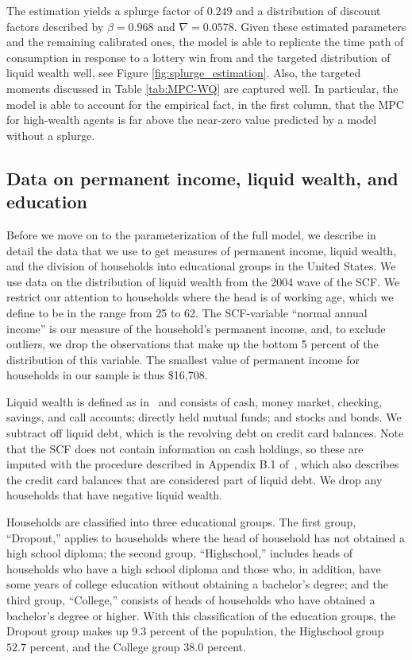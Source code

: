 \documentclass[\PathToRoot/\ProjectName]{subfiles}
\begin{document}
The estimation yields a splurge factor of $0.249$ and a distribution of discount factors described by $\beta = 0.968$ and $\nabla=0.0578$.
Given these estimated parameters and the remaining calibrated ones, the model is able to replicate the time path of consumption in response to a lottery win from \cite{fagereng-mpc-2021} and the targeted distribution of liquid wealth well, see Figure \ref{fig:splurge_estimation}.
Also, the targeted moments discussed in Table \ref{tab:MPC-WQ} are captured well.
In particular, the model is able to account for the empirical fact, in the first column, that the MPC for high-wealth agents is far above the near-zero value predicted by a model without a splurge.

\subsection{Data on permanent income, liquid wealth, and education}\whenintegrated{\label{data-on-permanent-income-liquid-wealth-and-education}}
\whenintegrated{\label{sec:SCFdata}}

Before we move on to the parameterization of the full model, we describe in detail the data that we use to get measures of permanent income, liquid wealth, and the division of households into educational groups in the United States.
We use data on the distribution of liquid wealth from the 2004 wave of the SCF.
We restrict our attention to households where the head is of working age, which we define to be in the range from 25 to 62.
The SCF-variable ``normal annual income'' is our measure of the household's permanent income, and, to exclude outliers, we drop the observations that make up the bottom 5 percent of the distribution of this variable.
The smallest value of permanent income for households in our sample is thus \$16,708.

Liquid wealth is defined as in~\cite{kaplan2014model} and consists of cash, money market, checking, savings, and call accounts; directly held mutual funds; and stocks and bonds.
We subtract off liquid debt, which is the revolving debt on credit card balances.
Note that the SCF does not contain information on cash holdings, so these are imputed with the procedure described in Appendix B.1 of~\cite{kaplan2014model}, which also describes the credit card balances that are considered part of liquid debt.
We drop any households that have negative liquid wealth.

Households are classified into three educational groups.
The first group, ``Dropout,'' applies to households where the head of household has not obtained a high school diploma; the second group, ``Highschool,'' includes heads of households who have a high school diploma and those who, in addition, have some years of college education without obtaining a bachelor's degree; and the third group, ``College,'' consists of heads of households who have obtained a bachelor's degree or higher.
With this classification of the education groups, the Dropout group makes up $9.3$ percent of the population, the Highschool group $52.7$ percent, and the College group $38.0$ percent.
\end{document}

